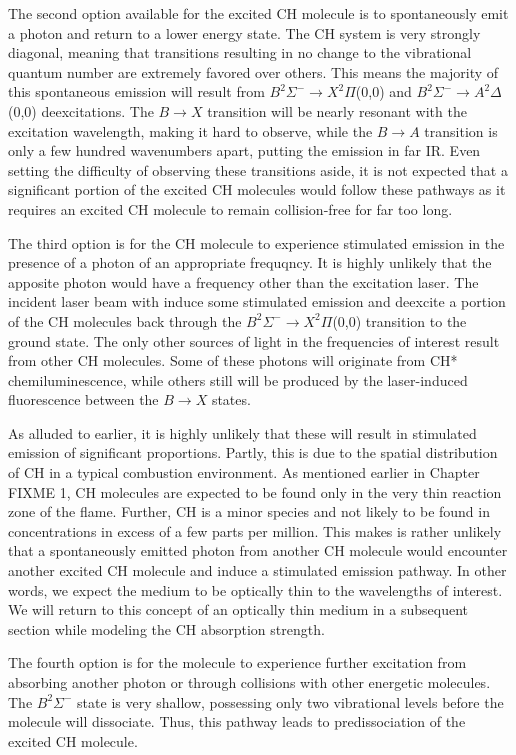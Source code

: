 The second option available for the excited CH molecule is to spontaneously emit a photon and return to a lower energy state.
The CH system is very strongly diagonal, meaning that transitions resulting in no change to the vibrational quantum number are extremely favored over others.
This means the majority of this spontaneous emission will result from \(B^2\Sigma^-\rightarrow X^2\Pi\)(0,0) and \(B^2\Sigma^-\rightarrow A^2\Delta\)(0,0) deexcitations.
The \(B\rightarrow X\) transition will be nearly resonant with the excitation wavelength, making it hard to observe, while the \(B\rightarrow A\) transition is only a few hundred wavenumbers apart, putting the emission in far IR.
Even setting the difficulty of observing these transitions aside, it is not expected that a significant portion of the excited CH molecules would follow these pathways as it requires an excited CH molecule to remain collision-free for far too long.

The third option is for the CH molecule to experience stimulated emission in the presence of a photon of an appropriate frequqncy.
It is highly unlikely that the apposite photon would have a frequency other than the excitation laser.
The incident laser beam with induce some stimulated emission and deexcite a portion of the CH molecules back through the \(B^2\Sigma^-\rightarrow X^2\Pi\)(0,0) transition to the ground state.
The only other sources of light in the frequencies of interest result from other CH molecules.
Some of these photons will originate from CH* chemiluminescence, while others still will be produced by the laser-induced fluorescence between the \(B\rightarrow X\) states.

As alluded to earlier, it is highly unlikely that these will result in stimulated emission of significant proportions.
Partly, this is due to the spatial distribution of CH in a typical combustion environment.
As mentioned earlier in Chapter FIXME 1, CH molecules are expected to be found only in the very thin reaction zone of the flame.
Further, CH is a minor species and not likely to be found in concentrations in excess of a few parts per million.
This makes is rather unlikely that a spontaneously emitted photon from another CH molecule would encounter another excited CH molecule and induce a stimulated emission pathway.
In other words, we expect the medium to be optically thin to the wavelengths of interest.
We will return to this concept of an optically thin medium in a subsequent section while modeling the CH absorption strength.

The fourth option is for the molecule to experience further excitation from absorbing another photon or through collisions with other energetic molecules.
The \(B^2\Sigma^-\) state is very shallow, possessing only two vibrational levels before the molecule will dissociate.
Thus, this pathway leads to predissociation of the excited CH molecule.


